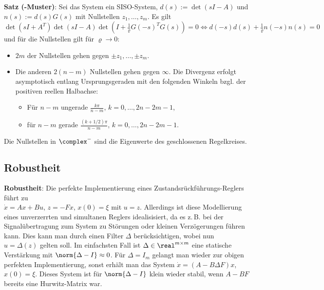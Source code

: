 \linie

\textbf{Satz (-Muster)}:
Sei das System ein SISO-System, $d(s) := \det(sI - A)$ und
$n(s) := d(s) G(s)$ mit Nullstellen $z_1, \dotsc, z_m$.
Es gilt\\
$\det(sI + A^T) \det(sI - A)
\det(I + \frac{1}{\varrho} G(-s)^T G(s)) = 0
\iff
d(-s) d(s) + \frac{1}{\varrho} n(-s) n(s) = 0$\\
und für die Nullstellen gilt für $\varrho \to 0$:
\begin{itemize}
    \item
    $2m$ der Nullstellen gehen gegen $\pm z_1, \dotsc, \pm z_m$.
    
    \item
    Die anderen $2(n - m)$ Nullstellen gehen gegen $\infty$.
    Die Divergenz erfolgt asymptotisch entlang Ursprungsgeraden mit den folgenden Winkeln
    bzgl. der positiven reellen Halbachse:
    \begin{itemize}
        \item
        Für $n - m$ ungerade
        $\frac{k\pi}{n - m}$, $k = 0, \dotsc, 2n - 2m - 1$,
        
        \item
        für $n - m$ gerade
        $\frac{(k + 1/2)\pi}{n - m}$, $k = 0, \dotsc, 2n - 2m - 1$.
    \end{itemize}
\end{itemize}
Die Nullstellen in $\complex^-$ sind die Eigenwerte des geschlossenen Regelkreises.

\pagebreak

\subsection{%
    Robustheit%
}

\textbf{Robustheit}:
Die perfekte Implementierung eines Zustandsrückführungs-Reglers führt zu\\
$\dot{x} = Ax + Bu$, $z = -Fx$, $x(0) = \xi$ mit $u = z$.
Allerdings ist diese Modellierung eines unverzerrten und simultanen Reglers
idealisisiert, da es z.\,B. bei der Signalübertragung zum
System zu Störungen oder kleinen Verzögerungen führen kann.
Dies kann man durch einen Filter $\Delta$ berücksichtigen, wobei nun $u = \Delta(z)$ gelten soll.
Im einfachsten Fall ist $\Delta \in \real^{m \times m}$ eine statische Verstärkung
mit $\norm{\Delta - I} \approx 0$.
Für $\Delta = I_m$ gelangt man wieder zur obigen perfekten Implementierung, sonst erhält man
das System $\dot{x} = (A - B\Delta F)x$, $x(0) = \xi$.
Dieses System ist für $\norm{\Delta - I}$ klein wieder stabil, wenn $A - BF$ bereits eine
Hurwitz-Matrix war.

